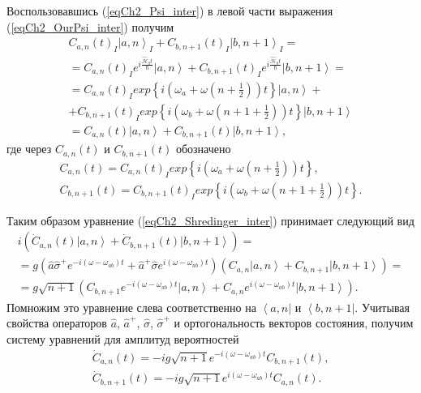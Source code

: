 Воспользовавшись (\ref{eqCh2_Psi_inter}) в левой части выражения
(\ref{eqCh2_OurPsi_inter}) получим 
\begin{eqnarray}
C_{a,n}\left(t\right)_I\left|a, n\right>_I +
C_{b,n+1}\left(t\right)_I\left|b, n + 1\right>_I =
\nonumber \\
= C_{a,n}\left(t\right)_I e^{i \frac{\hat{\mathcal{H}}_0
    t}{\hbar}} \left|a, n\right> +
C_{b,n+1}\left(t\right)_I e^{i \frac{\hat{\mathcal{H}}_0
    t}{\hbar}} \left|b, n + 1\right> = 
\nonumber \\
=
C_{a,n}\left(t\right)_I exp\left\{i \left(
 \omega_a +  \omega 
\left( n + \frac{1}{2}\right) 
\right) t
\right\} \left|a, n\right> +
\nonumber \\
+
C_{b,n+1}\left(t\right)_I exp\left\{i 
\left(
\omega_b +  \omega 
\left( n + 1 + \frac{1}{2}\right) 
\right)
    t \right\} \left|b, n + 1\right>
\nonumber \\
=
C_{a,n}\left(t\right) \left|a, n\right> +
C_{b,n+1}\left(t\right) \left|b, n + 1\right>,
\nonumber
\end{eqnarray}
где через $C_{a,n}\left(t\right)$ и $C_{b,n+1}\left(t\right)$
обозначено 
\begin{eqnarray}
C_{a,n}\left(t\right) = 
C_{a,n}\left(t\right)_I exp\left\{i 
\left(
\omega_a +  \omega 
\left( n + \frac{1}{2}\right) 
\right) 
    t \right\},
\nonumber \\
C_{b,n+1}\left(t\right) =
C_{b,n+1}\left(t\right)_I exp\left\{i \left(
\omega_b + \omega 
\left( n + 1 + \frac{1}{2}\right) 
\right)
    t\right\}.
\nonumber
\end{eqnarray}

Таким образом уравнение (\ref{eqCh2_Shredinger_inter}) принимает
следующий вид   
\begin{eqnarray}
i \left( 
{\dot C}_{a,n}\left(t\right)\left|a, n\right> +
{\dot C}_{b,n+1}\left(t\right)\left|b, n + 1\right>
\right) =
\nonumber \\
= g \left(
\hat{a}\hat{\sigma}^{+} e^{-i \left(\omega - \omega_{ab}\right)t} +
\hat{a}^{+}\hat{\sigma} e^{i \left(\omega - \omega_{ab}\right)t}
\right) 
\left( 
C_{a,n}\left|a, n\right> +
C_{b,n+1}\left|b, n + 1\right>
\right) = 
\nonumber \\
= g \sqrt{n + 1} \left(
C_{b, n+1} e^{-i \left(\omega - \omega_{ab}\right)t} \left|a, n\right> + 
C_{a, n} e^{i \left(\omega - \omega_{ab}\right)t} \left|b, n + 1\right>
\right).
\end{eqnarray}
Помножим это уравнение слева соответственно на 
$\left<a, n\right|$ и $\left<b, n + 1\right|$.  Учитывая свойства
операторов  $\hat{a}$, $\hat{a}^{+}$,  $\hat{\sigma}$,
$\hat{\sigma}^{+}$ и ортогональность векторов состояния, получим  
систему уравнений для амплитуд вероятностей 
\begin{eqnarray}
{\dot C}_{a,n}\left(t\right) = -i g \sqrt{n + 1}
e^{-i \left(\omega - \omega_{ab}\right)t} 
C_{b, n + 1}\left(t\right),
\nonumber \\
{\dot C}_{b, n + 1}\left(t\right) = -i g \sqrt{n + 1}
e^{i \left(\omega - \omega_{ab}\right)t} 
C_{a, n}\left(t\right).
\label{eqCh2_task3}
\end{eqnarray}


